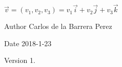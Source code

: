 $ \vec{v} = (v_1, v_2, v_3) = v_1 \vec{i} + v_2 \vec{j} + v_3 \vec{k} $ \begin{DoxyAuthor}{Author}
Carlos de la Barrera Perez 
\end{DoxyAuthor}
\begin{DoxyDate}{Date}
2018-\/1-\/23 
\end{DoxyDate}
\begin{DoxyVersion}{Version}
1. 
\end{DoxyVersion}
